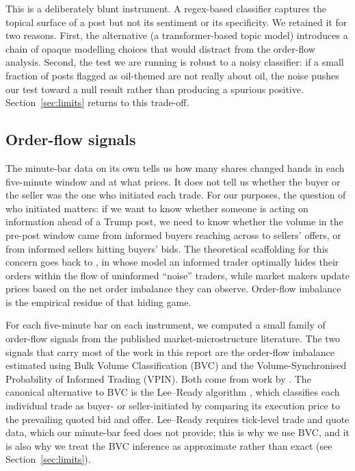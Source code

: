 \documentclass[11pt,a4paper]{article}
\begin{document}
This is a deliberately blunt instrument. A regex-based classifier captures the topical surface of a post but not its sentiment or its specificity. We retained it for two reasons. First, the alternative (a transformer-based topic model) introduces a chain of opaque modelling choices that would distract from the order-flow analysis. Second, the test we are running is robust to a noisy classifier: if a small fraction of posts flagged as oil-themed are not really about oil, the noise pushes our test toward a null result rather than producing a spurious positive. Section~\ref{sec:limits} returns to this trade-off.

\subsection{Order-flow signals}

The minute-bar data on its own tells us how many shares changed hands in each five-minute window and at what prices. It does not tell us whether the buyer or the seller was the one who initiated each trade. For our purposes, the question of who initiated matters: if we want to know whether someone is acting on information ahead of a Trump post, we need to know whether the volume in the pre-post window came from informed buyers reaching across to sellers' offers, or from informed sellers hitting buyers' bids. The theoretical scaffolding for this concern goes back to \citet{kyle1985}, in whose model an informed trader optimally hides their orders within the flow of uninformed ``noise'' traders, while market makers update prices based on the net order imbalance they can observe. Order-flow imbalance is the empirical residue of that hiding game.

For each five-minute bar on each instrument, we computed a small family of order-flow signals from the published market-microstructure literature. The two signals that carry most of the work in this report are the order-flow imbalance estimated using Bulk Volume Classification (BVC) and the Volume-Synchronised Probability of Informed Trading (VPIN). Both come from work by \citet{easley2012,easley2016}. The canonical alternative to BVC is the Lee--Ready algorithm \citep{leeready1991}, which classifies each individual trade as buyer- or seller-initiated by comparing its execution price to the prevailing quoted bid and offer. Lee--Ready requires tick-level trade and quote data, which our minute-bar feed does not provide; this is why we use BVC, and it is also why we treat the BVC inference as approximate rather than exact (see Section~\ref{sec:limits}).
\end{document}
